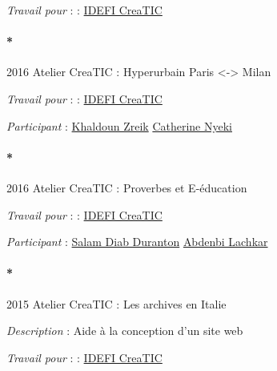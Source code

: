 \documentclass[
  a4paper,
  DIV=11,
  numbers=noendperiod]{scrreprt}
\let\oldparagraph\paragraph
\renewcommand{\paragraph}[1]{\oldparagraph{#1}\mbox{}}
\begin{document}
\emph{Travail pour} : :
\href{http://localhost/samszo/omk/s/fiches/item/299593}{IDEFI CreaTIC}

\paragraph*{2016 Atelier CreaTIC : Hyperurbain Paris
\textless-\textgreater{} Milan}\label{sec-item299731}

\emph{Travail pour} : :
\href{http://localhost/samszo/omk/s/fiches/item/299593}{IDEFI CreaTIC}

\emph{Participant} :
\href{http://localhost/samszo/omk/s/fiches/item/61173}{Khaldoun Zreik}
\href{http://localhost/samszo/omk/s/fiches/item/299620}{Catherine Nyeki}

\paragraph*{2016 Atelier CreaTIC : Proverbes et
E-éducation}\label{sec-item299732}

\emph{Travail pour} : :
\href{http://localhost/samszo/omk/s/fiches/item/299593}{IDEFI CreaTIC}

\emph{Participant} :
\href{http://localhost/samszo/omk/s/fiches/item/299618}{Salam Diab
Duranton}
\href{http://localhost/samszo/omk/s/fiches/item/299619}{Abdenbi Lachkar}

\paragraph*{2015 Atelier CreaTIC : Les archives en
Italie}\label{sec-item299735}

\emph{Description} : Aide à la conception d'un site web

\emph{Travail pour} : :
\href{http://localhost/samszo/omk/s/fiches/item/299593}{IDEFI CreaTIC}
\end{document}
